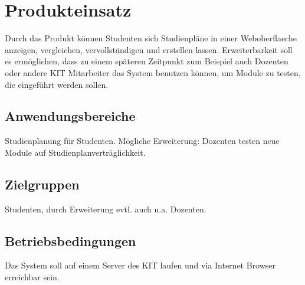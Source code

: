 \section{Produkteinsatz}
Durch das Produkt können Studenten sich Studienpläne in einer \gls{Weboberflaeche} anzeigen, vergleichen, vervollständigen und erstellen lassen. Erweiterbarkeit soll es ermöglichen, dass zu einem späteren Zeitpunkt zum Beispiel auch Dozenten oder andere KIT Mitarbeiter das System benutzen können, um Module zu testen, die eingeführt werden sollen. 

\subsection{Anwendungsbereiche}
Studienplanung für Studenten. Mögliche Erweiterung: Dozenten testen neue Module auf Studienplanverträglichkeit.

\subsection{Zielgruppen}
Studenten, durch Erweiterung evtl. auch u.a. Dozenten.
\subsection{Betriebsbedingungen}
Das System soll auf einem Server des KIT laufen und via Internet Browser erreichbar sein.